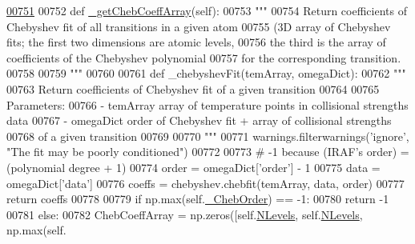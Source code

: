 \begin{DoxyCode}
\hypertarget{classpyneb_1_1core_1_1pynebcore_1_1___coll_data_fits_l00751}{}\hyperlink{classpyneb_1_1core_1_1pynebcore_1_1___coll_data_fits_a6f9e4fd3e9196fe259da3175e14b88b9}{00751} 
00752     \textcolor{keyword}{def }\hyperlink{classpyneb_1_1core_1_1pynebcore_1_1___coll_data_fits_a6f9e4fd3e9196fe259da3175e14b88b9}{\_getChebCoeffArray}(self):
00753         \textcolor{stringliteral}{"""}
00754 \textcolor{stringliteral}{        Return coefficients of Chebyshev fit of all transitions in a given atom}
00755 \textcolor{stringliteral}{            (3D array of Chebyshev fits; the first two dimensions are atomic levels,}
00756 \textcolor{stringliteral}{            the third is the array of coefficients of the Chebyshev polynomial}
00757 \textcolor{stringliteral}{            for the corresponding transition.}
00758 \textcolor{stringliteral}{}
00759 \textcolor{stringliteral}{        """}
00760 
00761         \textcolor{keyword}{def }\_chebyshevFit(temArray, omegaDict):
00762             \textcolor{stringliteral}{"""}
00763 \textcolor{stringliteral}{            Return coefficients of Chebyshev fit of a given transition}
00764 \textcolor{stringliteral}{            }
00765 \textcolor{stringliteral}{            Parameters:}
00766 \textcolor{stringliteral}{                - temArray    array of temperature points in collisional strengths data}
00767 \textcolor{stringliteral}{                - omegaDict   order of Chebyshev fit + array of collisional strengths }
00768 \textcolor{stringliteral}{                                of a given transition}
00769 \textcolor{stringliteral}{}
00770 \textcolor{stringliteral}{            """}
00771             warnings.filterwarnings(\textcolor{stringliteral}{'ignore'}, \textcolor{stringliteral}{"The fit may be poorly conditioned"})
00772 
00773             \textcolor{comment}{# -1 because (IRAF's order) = (polynomial degree + 1)}
00774             order = omegaDict[\textcolor{stringliteral}{'order'}] - 1
00775             data = omegaDict[\textcolor{stringliteral}{'data'}]
00776             coeffs = chebyshev.chebfit(temArray, data, order)
00777             \textcolor{keywordflow}{return} coeffs
00778         
00779         \textcolor{keywordflow}{if} np.max(self.\hyperlink{classpyneb_1_1core_1_1pynebcore_1_1___coll_data_fits_aeb6a6f312ca21c1e1b3aa72225a0d442}{\_ChebOrder}) == -1:
00780             \textcolor{keywordflow}{return} -1
00781         \textcolor{keywordflow}{else}:
00782             ChebCoeffArray = np.zeros([self.\hyperlink{classpyneb_1_1core_1_1pynebcore_1_1___coll_data_fits_a64b97a86b4dfb53e4cba3ce8ac0fdf00}{NLevels}, self.\hyperlink{classpyneb_1_1core_1_1pynebcore_1_1___coll_data_fits_a64b97a86b4dfb53e4cba3ce8ac0fdf00}{NLevels}, np.max(self.

\end{DoxyCode}
